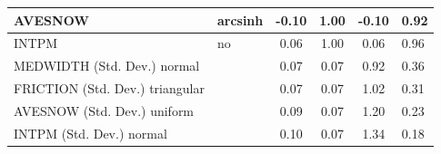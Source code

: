 \begin{table}
\begin{center}
\begin{tabular}{|l|l|c|c|c|l|}
			\hline
			AVESNOW & arcsinh & -0.10 & 1.00 & -0.10 & 0.92 \\
			\hline
			INTPM & no & 0.06 & 1.00 & 0.06 & 0.96 \\
			\hline
			MEDWIDTH (Std. Dev.) normal &  & 0.07 & 0.07 & 0.92 & 0.36 \\
			\hline
			FRICTION (Std. Dev.) triangular &  & 0.07 & 0.07 & 1.02 & 0.31 \\
			\hline
			AVESNOW (Std. Dev.) uniform &  & 0.09 & 0.07 & 1.20 & 0.23 \\
			\hline
			INTPM (Std. Dev.) normal &  & 0.10 & 0.07 & 1.34 & 0.18 \\
			\hline
		\end{tabular}
	\end{center}
\end{table}